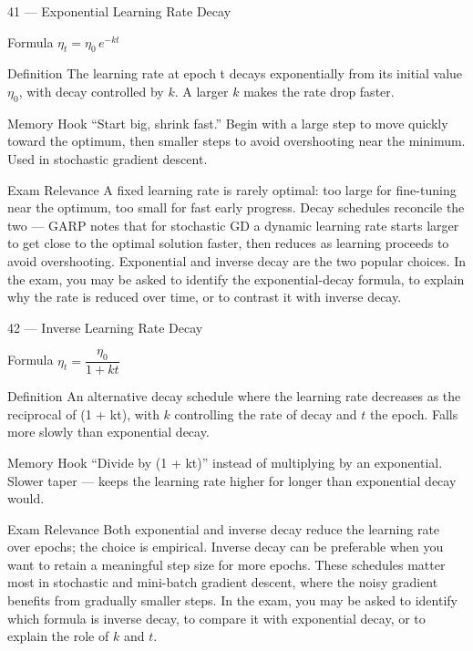 \documentclass[aspectratio=169,8pt]{beamer}
\begin{document}
	\begin{frame}{41 --- Exponential Learning Rate Decay}
		\begin{block}{Formula}
			$\eta_t = \eta_0\,e^{-kt}$
		\end{block}
		\begin{block}{Definition}
			The learning rate at epoch t decays exponentially from its initial value $\eta_0$, with decay controlled by $k$. A larger $k$ makes the rate drop faster.
		\end{block}
		\begin{block}{Memory Hook}
			``Start big, shrink fast.'' Begin with a large step to move quickly toward the optimum, then smaller steps to avoid overshooting near the minimum. Used in stochastic gradient descent.
		\end{block}
		\begin{block}{Exam Relevance}
			A fixed learning rate is rarely optimal: too large for fine-tuning near the optimum, too small for fast early progress. Decay schedules reconcile the two --- GARP notes that for stochastic GD a dynamic learning rate starts larger to get close to the optimal solution faster, then reduces as learning proceeds to avoid overshooting. Exponential and inverse decay are the two popular choices. In the exam, you may be asked to identify the exponential-decay formula, to explain why the rate is reduced over time, or to contrast it with inverse decay.
		\end{block}
	\end{frame}
	
	\begin{frame}{42 --- Inverse Learning Rate Decay}
		\begin{block}{Formula}
			$\eta_t = \dfrac{\eta_0}{1 + kt}$
		\end{block}
		\begin{block}{Definition}
			An alternative decay schedule where the learning rate decreases as the reciprocal of (1 + kt), with $k$ controlling the rate of decay and $t$ the epoch. Falls more slowly than exponential decay.
		\end{block}
		\begin{block}{Memory Hook}
			``Divide by (1 + kt)'' instead of multiplying by an exponential. Slower taper --- keeps the learning rate higher for longer than exponential decay would.
		\end{block}
		\begin{block}{Exam Relevance}
			Both exponential and inverse decay reduce the learning rate over epochs; the choice is empirical. Inverse decay can be preferable when you want to retain a meaningful step size for more epochs. These schedules matter most in stochastic and mini-batch gradient descent, where the noisy gradient benefits from gradually smaller steps. In the exam, you may be asked to identify which formula is inverse decay, to compare it with exponential decay, or to explain the role of $k$ and $t$.
		\end{block}
	\end{frame}
	
\end{document}
